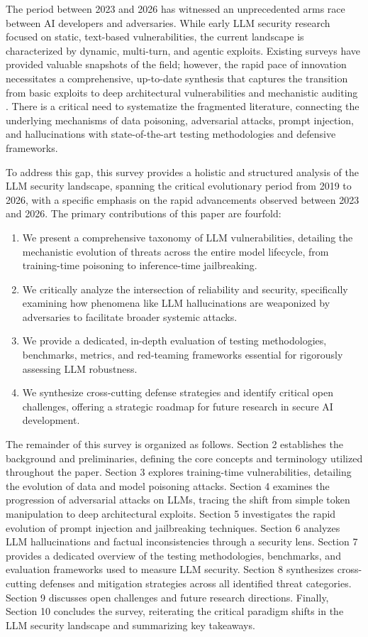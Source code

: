 \documentclass[11pt,a4paper]{article}
\begin{document}
The period between 2023 and 2026 has witnessed an unprecedented arms race between AI developers and adversaries. While early LLM security research focused on static, text-based vulnerabilities, the current landscape is characterized by dynamic, multi-turn, and agentic exploits. Existing surveys have provided valuable snapshots of the field; however, the rapid pace of innovation necessitates a comprehensive, up-to-date synthesis that captures the transition from basic exploits to deep architectural vulnerabilities and mechanistic auditing . There is a critical need to systematize the fragmented literature, connecting the underlying mechanisms of data poisoning, adversarial attacks, prompt injection, and hallucinations with state-of-the-art testing methodologies and defensive frameworks.

To address this gap, this survey provides a holistic and structured analysis of the LLM security landscape, spanning the critical evolutionary period from 2019 to 2026, with a specific emphasis on the rapid advancements observed between 2023 and 2026. The primary contributions of this paper are fourfold:
\begin{enumerate}
  \item We present a comprehensive taxonomy of LLM vulnerabilities, detailing the mechanistic evolution of threats across the entire model lifecycle, from training-time poisoning to inference-time jailbreaking.
  \item We critically analyze the intersection of reliability and security, specifically examining how phenomena like LLM hallucinations are weaponized by adversaries to facilitate broader systemic attacks.
  \item We provide a dedicated, in-depth evaluation of testing methodologies, benchmarks, metrics, and red-teaming frameworks essential for rigorously assessing LLM robustness.
  \item We synthesize cross-cutting defense strategies and identify critical open challenges, offering a strategic roadmap for future research in secure AI development.
\end{enumerate}
The remainder of this survey is organized as follows. Section 2 establishes the background and preliminaries, defining the core concepts and terminology utilized throughout the paper. Section 3 explores training-time vulnerabilities, detailing the evolution of data and model poisoning attacks. Section 4 examines the progression of adversarial attacks on LLMs, tracing the shift from simple token manipulation to deep architectural exploits. Section 5 investigates the rapid evolution of prompt injection and jailbreaking techniques. Section 6 analyzes LLM hallucinations and factual inconsistencies through a security lens. Section 7 provides a dedicated overview of the testing methodologies, benchmarks, and evaluation frameworks used to measure LLM security. Section 8 synthesizes cross-cutting defenses and mitigation strategies across all identified threat categories. Section 9 discusses open challenges and future research directions. Finally, Section 10 concludes the survey, reiterating the critical paradigm shifts in the LLM security landscape and summarizing key takeaways.
\end{document}
